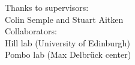 \documentclass{beamer}
\begin{document}
{
\begin{frame}{}
\begin{tcolorbox}[colback=blue!40!black,colframe=blue!40!black]
\begin{center}
{
{\small Thanks to supervisors:} \\ 
Colin Semple and
Stuart Aitken \\
\vspace{1em}
{\small Collaborators:} \\
Hill lab (University of Edinburgh) \\ 
Pombo lab (Max Delbr\"uck center)

}

\end{center}
\end{tcolorbox}

\end{frame}
}
\end{document}
